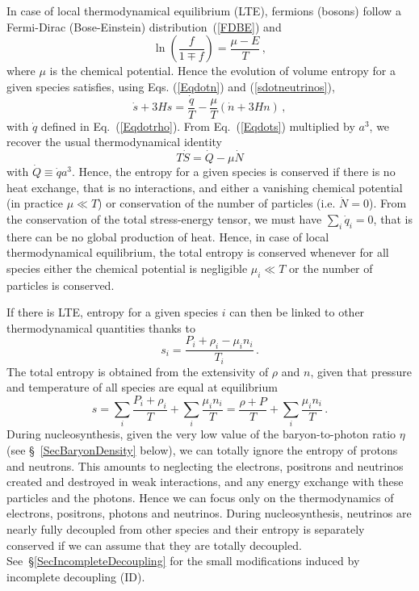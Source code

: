 \documentclass[onecolumn,float,floatfix,preprintnumbers,aps,rmp,nofootinbib,amsmath,amssymb,amsfonts,superscriptaddress,tightenlines]{revtex4}
\newcommand{\be}{\begin{equation}}
\newcommand{\ee}{\end{equation}}
\begin{document}
In case of local thermodynamical equilibrium (LTE), fermions (bosons) follow a
Fermi-Dirac (Bose-Einstein) distribution~(\ref{FDBE}) and
\be
\ln\left(\frac{f}{1\mp f}\right) = \frac{\mu-E}{T}\,,
\ee 
where $\mu$ is the chemical potential. Hence the evolution of volume
entropy for a given species satisfies, using Eqs. (\ref{Eqdotn}) and (\ref{sdotneutrinos}),
\be\label{Eqdots}
\dot s + 3 H s = \frac{\dot q}{T} -\frac{\mu}{T}(\dot n + 3H
n)\,,
\ee
with $\dot q$ defined in Eq.~(\ref{Eqdotrho}).
From Eq.~(\ref{Eqdots}) multiplied by $a^3$, we recover the usual thermodynamical identity 
\be\label{DotS}
T \dot S = \dot Q -\mu \dot N
\ee 
with $\dot Q \equiv \dot q a^3$. Hence, the entropy for a given species is
conserved if there is no heat exchange, that is no interactions, and
either a vanishing chemical potential (in practice $\mu\ll T$) or
conservation of the number of particles (i.e. $\dot N=0$). From the conservation of the total stress-energy tensor, we must have
$\sum_i \dot q_i =0$, that is there can be no global production of
heat. Hence, in case of local thermodynamical equilibrium, the total entropy is conserved whenever for all species
either the chemical potential is negligible $\mu_i \ll T$ or the
number of particles is conserved.

If there is LTE, entropy for a given species $i$ can then be linked to other thermodynamical quantities
thanks to
\be\label{sexpression}
s_i = \frac{P_i+\rho_i-\mu_i n_i}{T_i}\,.
\ee
The total entropy is obtained from the extensivity of $\rho$ and $n$,
given that pressure and temperature of all species are equal  at equilibrium
\be
s = \sum_i \frac{P_i + \rho_i }{T} + \sum_i \frac{\mu_i n_i}{T}=\frac{\rho+P}{T}+ \sum_i \frac{\mu_i n_i}{T}\,.
\ee
During nucleosynthesis, given the very low value of the
baryon-to-photon ratio $\eta$ (see \S~\ref{SecBaryonDensity} below),
we can totally ignore the entropy of protons and neutrons. This amounts to neglecting the electrons, positrons and
neutrinos created and destroyed in weak interactions, and any energy exchange with
these particles and the photons.  Hence we can focus only on the thermodynamics of electrons,
positrons, photons and neutrinos. During nucleosynthesis, neutrinos
are nearly fully decoupled from other species and their entropy is separately conserved
if we can assume that they are totally decoupled. See~\S \ref{SecIncompleteDecoupling} for the small modifications
induced by incomplete decoupling (ID). 
\end{document}
